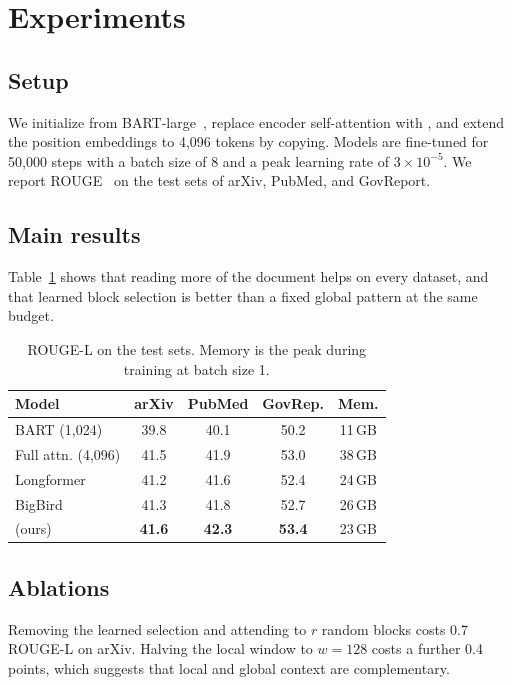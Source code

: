 \section{Experiments}
\label{sec:experiments}

\subsection{Setup}

We initialize from BART-large~\citep{lewis2020bart}, replace encoder self-attention with \model{}, and extend the position embeddings to 4{,}096 tokens by copying. Models are fine-tuned for 50{,}000 steps with a batch size of 8 and a peak learning rate of $3 \times 10^{-5}$. We report ROUGE~\citep{lin2004rouge} on the test sets of arXiv, PubMed, and GovReport.

\subsection{Main results}

Table~\ref{tab:main} shows that reading more of the document helps on every dataset, and that learned block selection is better than a fixed global pattern at the same budget.

\begin{table}[t]
  \centering
  \caption{ROUGE-L on the test sets. Memory is the peak during training at batch size 1.}
  \label{tab:main}
  \small
  \begin{tabular}{lcccc}
    \toprule
    Model & arXiv & PubMed & GovRep. & Mem. \\
    \midrule
    BART (1{,}024) & 39.8 & 40.1 & 50.2 & 11\,GB \\
    Full attn. (4{,}096) & 41.5 & 41.9 & 53.0 & 38\,GB \\
    Longformer & 41.2 & 41.6 & 52.4 & 24\,GB \\
    BigBird & 41.3 & 41.8 & 52.7 & 26\,GB \\
    \model{} (ours) & \textbf{41.6} & \textbf{42.3} & \textbf{53.4} & 23\,GB \\
    \bottomrule
  \end{tabular}
\end{table}

\subsection{Ablations}

Removing the learned selection and attending to $r$ random blocks costs 0.7 ROUGE-L on arXiv. Halving the local window to $w = 128$ costs a further 0.4 points, which suggests that local and global context are complementary.
